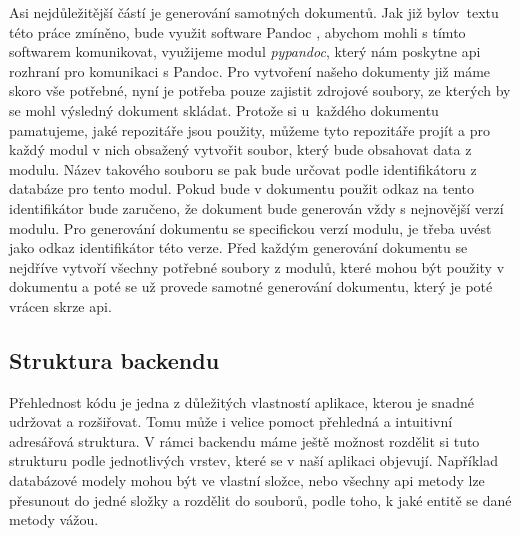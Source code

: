 Asi nejdůležitější částí je generování samotných dokumentů. Jak již bylo\linebreak v~textu této práce zmíněno, bude využit software Pandoc \cite{pandocSW}, abychom mohli s tímto softwarem
komunikovat, využijeme modul \textit{pypandoc}, který nám poskytne \gls{api} rozhraní pro komunikaci s Pandoc. Pro vytvoření našeho dokumenty již máme skoro vše potřebné, nyní
je potřeba pouze zajistit zdrojové soubory, ze kterých by se mohl výsledný dokument skládat. Protože si u~každého dokumentu pamatujeme, jaké repozitáře jsou použity, můžeme
tyto repozitáře projít a pro každý modul v nich obsažený vytvořit soubor, který bude obsahovat data z modulu. Název takového souboru se pak bude určovat podle identifikátoru
z databáze pro tento modul. Pokud bude v dokumentu použit odkaz na tento identifikátor bude zaručeno, že dokument bude generován vždy s nejnovější verzí modulu. Pro generování
dokumentu se specifickou verzí modulu, je třeba uvést jako odkaz identifikátor této verze. Před každým generování dokumentu se nejdříve vytvoří všechny potřebné soubory z modulů,
které mohou být použity v dokumentu a poté se už provede samotné generování dokumentu, který je poté vrácen skrze \gls{api}.

\clearpage

\subsection{Struktura backendu}

Přehlednost kódu je jedna z důležitých vlastností aplikace, kterou je snadné udržovat a rozšiřovat. Tomu může i velice pomoct přehledná a intuitivní adresářová struktura.
V rámci backendu máme ještě možnost rozdělit si tuto strukturu podle jednotlivých vrstev, které se v naší aplikaci objevují. Například databázové modely mohou být ve vlastní složce,
nebo všechny \gls{api} metody lze přesunout do jedné složky a rozdělit do souborů, podle toho, k jaké entitě se dané metody vážou.

\begin{listing}[H]
\end{listing}


